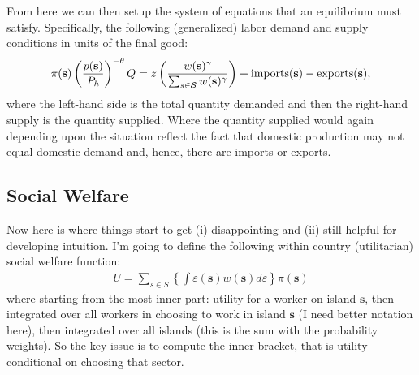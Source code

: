 \documentclass[pdftex,12pt]{article}
\begin{document}
From here we can then setup the system of equations that an equilibrium must satisfy. Specifically, the following (generalized) labor demand and supply conditions in units of the final good:
\begin{align}
\pi(\textbf{s}) \left(\frac{p(\textbf{s})}{P_h}\right)^{-\theta}Q =  z \left(\frac{w(\textbf{s})^{\gamma}}{\sum_{s \in \mathcal{S}} w(\textbf{s})^{\gamma}} \right) + \mbox{\normalfont imports}(\textbf{s}) - \mbox{\normalfont exports(\textbf{s})} ,
\end{align}
where the left-hand side is the total quantity demanded and then the right-hand supply is the quantity supplied. Where the quantity supplied would again depending upon the situation reflect the fact that domestic production may not equal domestic demand and, hence, there are imports or exports.

\newpage

\subsection{Social Welfare}

Now here is where things start to get (i) disappointing and (ii) still helpful for developing intuition. I'm going to define the following within country (utilitarian) social welfare function:
\begin{align}
U = \sum_{s \in S} \left\{\int \varepsilon(\textbf{s}) w(\textbf{s})d\varepsilon \right\} \pi(\textbf{s})
\label{eq:expected_utility}
\end{align}
where starting from the most inner part: utility for a worker on island $\textbf{s}$, then integrated over all workers in choosing to work in island $\textbf{s}$ (I need better notation here), then integrated over all islands (this is the sum with the probability weights). So the key issue is to compute the inner bracket, that is utility conditional on choosing that sector. 
\end{document}
